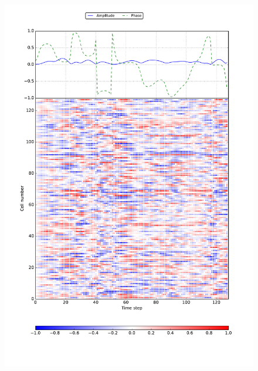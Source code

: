 \begin{figure}[!t]
\centering
\includegraphics[width=1\columnwidth]{figures/layer_1_new1.pdf}

\end{figure}
